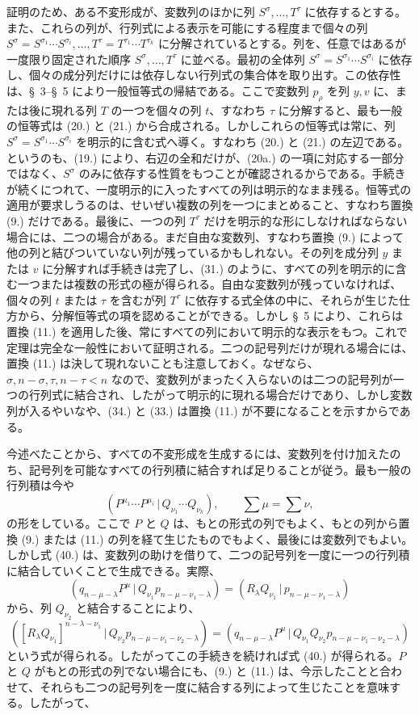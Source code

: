 \documentclass[11pt]{jlreq}
\newcommand{\pair}[2]{(#1\,|\,#2)}
\begin{document}
証明のため、ある不変形成が、変数列のほかに列 $S^\sigma,\ldots,T^\tau$ に依存するとする。また、これらの列が、行列式による表示を可能にする程度まで個々の列 $S^\sigma=S^{\sigma_1}\cdots S^{\sigma_i},\ldots,T^\tau=T^{\tau_1}\cdots T^{\tau_k}$ に分解されているとする。列を、任意ではあるが一度限り固定された順序 $S^\sigma,\ldots,T^\tau$ に並べる。最初の全体列 $S^\sigma=S^{\sigma_1}\cdots S^{\sigma_i}$ に依存し、個々の成分列だけには依存しない行列式の集合体を取り出す。この依存性は、\S\ 3--\S\ 5 により一般恒等式の帰結である。ここで変数列 $p_\rho$ を列 $y,v$ に、または後に現れる列 $T$ の一つを個々の列 $t$、すなわち $\tau$ に分解すると、最も一般の恒等式は (20.) と (21.) から合成される。しかしこれらの恒等式は常に、列 $S^\sigma=S^{\sigma_1}\cdots S^{\sigma_i}$ を明示的に含む式へ導く。すなわち (20.) と (21.) の左辺である。というのも、(19.) により、右辺の全和だけが、(20a.) の一項に対応する一部分ではなく、$S^\sigma$ のみに依存する性質をもつことが確認されるからである。手続きが続くにつれて、一度明示的に入ったすべての列は明示的なまま残る。恒等式の適用が要求しうるのは、せいぜい複数の列を一つにまとめること、すなわち置換 (9.) だけである。最後に、一つの列 $T^\tau$ だけを明示的な形にしなければならない場合には、二つの場合がある。まだ自由な変数列、すなわち置換 (9.) によって他の列と結びついていない列が残っているかもしれない。その列を成分列 $y$ または $v$ に分解すれば手続きは完了し、(31.) のように、すべての列を明示的に含む一つまたは複数の形式の極が得られる。自由な変数列が残っていなければ、個々の列 $t$ または $\tau$ を含むが列 $T^\tau$ に依存する式全体の中に、それらが生じた仕方から、分解恒等式の項を認めることができる。しかし \S\ 5 により、これらは置換 (11.) を適用した後、常にすべての列において明示的な表示をもつ。これで定理は完全な一般性において証明される。二つの記号列だけが現れる場合には、置換 (11.) は決して現れないことも注意しておく。なぜなら、$\sigma,n-\sigma,\tau,n-\tau<n$ なので、変数列がまったく入らないのは二つの記号列が一つの行列式に結合され、したがって明示的に現れる場合だけであり、しかし変数列が入るやいなや、(34.) と (33.) は置換 (11.) が不要になることを示すからである。

今述べたことから、すべての不変形成を生成するには、変数列を付け加えたのち、記号列を可能なすべての行列積に結合すれば足りることが従う。最も一般の行列積は今や
\begin{equation}
 \pair{P^{\mu_1}\cdots P^{\mu_i}}{Q_{\nu_1}\cdots Q_{\nu_k}},\qquad \sum\mu=\sum\nu,
\tag{40}
\end{equation}
の形をしている。ここで $P$ と $Q$ は、もとの形式の列でもよく、もとの列から置換 (9.) または (11.) の列を経て生じたものでもよく、最後には変数列でもよい。しかし式 (40.) は、変数列の助けを借りて、二つの記号列を一度に一つの行列積に結合していくことで生成できる。実際、
\[
 \pair{q_{n-\mu-\lambda}P^\mu}{Q_{\nu_1}p_{n-\mu-\nu_1-\lambda}}=\pair{R_\lambda Q_{\nu_1}}{p_{n-\mu-\nu_1-\lambda}}
\]
から、列 $Q_{\nu_2}$ と結合することにより、
\[
 \pair{[R_\lambda Q_{\nu_1}]^{n-\lambda-\nu_1}}{Q_{\nu_2}p_{n-\mu-\nu_1-\nu_2-\lambda}}
 =\pair{q_{n-\mu-\lambda}P^\mu}{Q_{\nu_1}Q_{\nu_2}p_{n-\mu-\nu_1-\nu_2-\lambda}}
\]
という式が得られる。したがってこの手続きを続ければ式 (40.) が得られる。$P$ と $Q$ がもとの形式の列でない場合にも、(9.) と (11.) は、今示したことと合わせて、それらも二つの記号列を一度に結合する列によって生じたことを意味する。したがって、
\end{document}
